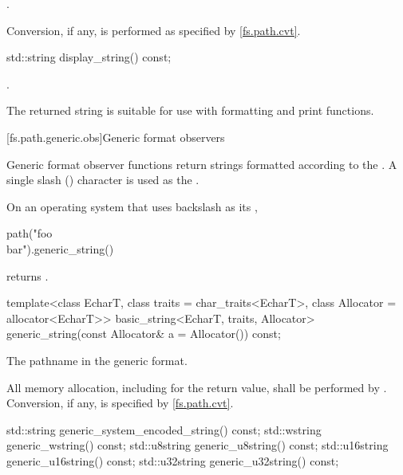 \begin{itemdescr}
\pnum
\returns
{}.

\pnum
\remarks
Conversion, if any, is performed as specified
by \ref{fs.path.cvt}.
\end{itemdescr}

%
\begin{itemdecl}
std::string display_string() const;
\end{itemdecl}

\begin{itemdescr}
\pnum
\returns
{}.
\begin{note}
The returned string is suitable for use with formatting
and print functions.
\end{note}
\end{itemdescr}

[fs.path.generic.obs]{Generic format observers}

\pnum
Generic format observer functions return strings formatted according to the
.
A single slash () character is used as
the .

\pnum
\begin{example}
On an operating system that uses backslash as
its ,
\begin{codeblock}
path("foo\\bar").generic_string()
\end{codeblock}
returns .
\end{example}

%
\begin{itemdecl}
template<class EcharT, class traits = char_traits<EcharT>, class Allocator = allocator<EcharT>>
  basic_string<EcharT, traits, Allocator> generic_string(const Allocator& a = Allocator()) const;
\end{itemdecl}

\begin{itemdescr}
\pnum
\returns
The pathname in the generic format.

\pnum
\remarks
All memory allocation, including for the return value, shall
be performed by . Conversion, if any, is specified by
\ref{fs.path.cvt}.
\end{itemdescr}

%
%
%
%
%
\begin{itemdecl}
std::string generic_system_encoded_string() const;
std::wstring generic_wstring() const;
std::u8string generic_u8string() const;
std::u16string generic_u16string() const;
std::u32string generic_u32string() const;
\end{itemdecl}

